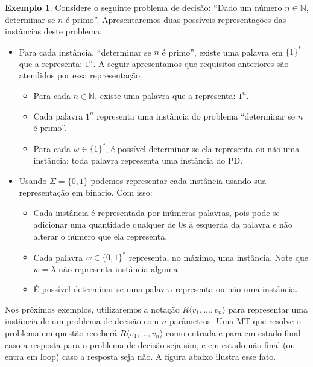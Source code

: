 \documentclass[a4paper]{article}
\theoremstyle{definition}
\newtheorem{Example}{Exemplo}
\begin{document}
  \begin{Example}
    Considere o seguinte problema de decisão: ``Dado um número $n\in\mathbb{N}$,
    determinar se $n$ é primo''. Apresentaremos duas possíveis representações
    das instâncias deste problema:
    \begin{itemize}
       \item Para cada instância, ``determinar se $n$ é primo'', existe uma
         palavra em $\{1\}^*$ que a representa: $1^n$. A seguir apresentamos que
         requisitos anteriores são atendidos por essa representação.
         \begin{itemize}
           \item Para cada $n \in\mathbb{N}$, existe uma palavra que a
             representa: $1^n$.
           \item Cada palavra $1^n$ representa uma instância do problema
             ``determinar se $n$ é primo''.
           \item Para cada $w \in\{1\}^*$, é possível determinar se ela
             representa ou não uma instância: toda palavra representa uma
             instância do PD.
           \end{itemize}
         \item Usando $\Sigma=\{0,1\}$ podemos representar cada instância usando
           sua representação em binário. Com isso:
           \begin{itemize}
             \item Cada instância é representada por inúmeras palavras, pois
               pode-se adicionar uma quantidade qualquer de 0s à esquerda da
               palavra e não alterar o número que ela representa.
             \item Cada palavra $w \in \{0,1\}^*$ representa, no máximo, uma
               instância. Note que $w = \lambda$ não representa instância
               alguma.
             \item É possível determinar se uma palavra representa ou não uma instância.
           \end{itemize}
    \end{itemize}
  \end{Example}

  Nos próximos exemplos, utilizaremos a notação $R\langle v_1,...,v_n \rangle$
  para representar uma instância de um problema de decisão com $n$ parâmetros.
  Uma MT que resolve o problema em questão receberá $R\langle v_1,...,v_n
  \rangle$ como entrada e para em estado final caso a resposta para o problema de decisão seja
  sim, e em estado não final (ou entra em loop) caso a resposta seja não. A
  figura abaixo ilustra esse fato.
\end{document}
